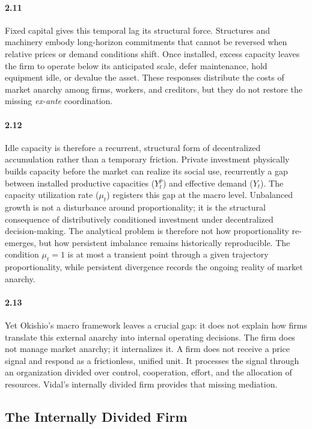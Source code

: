 \paragraph{2.11} Fixed capital gives this temporal lag its structural force.
Structures and machinery embody long-horizon commitments that
cannot be reversed when relative prices or demand conditions
shift. Once installed, excess capacity leaves the firm to
operate below its anticipated scale, defer maintenance, hold
equipment idle, or devalue the asset. These responses
distribute the costs of market anarchy among firms, workers,
and creditors, but they do not restore the missing
\textit{ex-ante} coordination.

\paragraph{2.12} Idle capacity is therefore a recurrent, structural form of
decentralized accumulation rather than a temporary friction.
Private investment physically builds capacity before the market
can realize its social use, recurrently a gap
between installed productive capacities ($Y^p_t$) and effective demand ($Y_t$). The capacity utilization rate ($\mu_t$) registers this gap at the macro level. Unbalanced growth is not a disturbance around proportionality; it is the structural consequence of distributively conditioned investment under
decentralized decision-making. The analytical problem is
therefore not how proportionality re-emerges, but how persistent
imbalance remains historically reproducible. The condition
$\mu_t = 1$ is at most a transient point through a given trajectory
proportionality, while persistent divergence records the ongoing
reality of market anarchy.

\paragraph{2.13} Yet Okishio's macro framework leaves a crucial gap: it does not explain how firms translate this external anarchy into internal operating decisions. The firm does not manage market anarchy; it internalizes it. A firm does not receive a price signal and respond as a frictionless, unified unit. It processes the signal through an organization divided over control, cooperation,
effort, and the allocation of resources. Vidal's internally
divided firm provides that missing mediation.

\subsection{The Internally Divided Firm}

